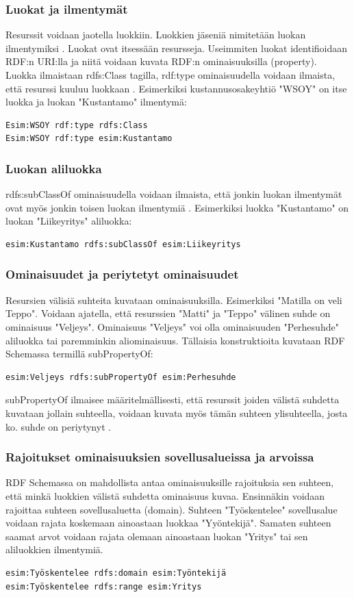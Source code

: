 \documentclass[finnish]{tktltiki2}
\theoremstyle{definition}
\theoremstyle{remark}
\begin{document}
\subsubsection{Luokat ja ilmentymät}
Resurssit voidaan jaotella luokkiin. Luokkien jäseniä nimitetään luokan ilmentymiksi \cite{RDFS}. Luokat ovat itsessään resursseja. Useimmiten luokat identifioidaan RDF:n URI:lla ja niitä voidaan kuvata RDF:n ominaisuuksilla (property). Luokka ilmaistaan rdfs:Class tagilla, rdf:type ominaisuudella voidaan ilmaista, että resurssi kuuluu luokkaan \cite{RDFS}. Esimerkiksi kustannusosakeyhtiö "WSOY" on itse luokka ja  luokan "Kustantamo" ilmentymä:
\begin{verbatim}
Esim:WSOY rdf:type rdfs:Class
Esim:WSOY rdf:type esim:Kustantamo
\end{verbatim}  

\subsubsection{Luokan aliluokka}
rdfs:subClassOf ominaisuudella voidaan ilmaista, että jonkin luokan ilmentymät ovat myös jonkin toisen luokan ilmentymiä \cite{RDFS}. Esimerkiksi 
luokka "Kustantamo" on luokan "Liikeyritys" aliluokka:
\begin{verbatim}
esim:Kustantamo rdfs:subClassOf esim:Liikeyritys 
\end{verbatim}

\subsubsection{Ominaisuudet ja periytetyt ominaisuudet}
Resursien välisiä suhteita kuvataan ominaisuuksilla. Esimerkiksi "Matilla on veli Teppo". Voidaan ajatella, että resurssien "Matti" ja "Teppo" välinen suhde on ominaisuus "Veljeys". Ominaisuus "Veljeys" voi olla ominaisuuden "Perhesuhde"  aliluokka tai paremminkin aliominaisuus. Tällaisia konstruktioita kuvataan RDF Schemassa termillä subPropertyOf: 
\begin{verbatim}
esim:Veljeys rdfs:subPropertyOf esim:Perhesuhde
\end{verbatim}
 subPropertyOf ilmaisee määritelmällisesti, että resurssit joiden välistä suhdetta kuvataan jollain suhteella, voidaan kuvata myös tämän suhteen ylisuhteella, josta ko. suhde on periytynyt \cite{RDFS}. 
\subsubsection{Rajoitukset ominaisuuksien sovellusalueissa ja arvoissa}
RDF Schemassa on mahdollista antaa ominaisuuksille rajoituksia sen suhteen, että minkä luokkien välistä suhdetta ominaisuus kuvaa. Ensinnäkin
voidaan rajoittaa suhteen sovellusaluetta (domain). Suhteen  "Työskentelee" sovellusalue voidaan rajata koskemaan ainoastaan luokkaa "Yyöntekijä". Samaten suhteen saamat arvot voidaan rajata olemaan ainoastaan luokan "Yritys" tai sen aliluokkien ilmentymiä. 
\begin{verbatim}
esim:Työskentelee rdfs:domain esim:Työntekijä
esim:Työskentelee rdfs:range esim:Yritys
\end{verbatim}
\end{document}
